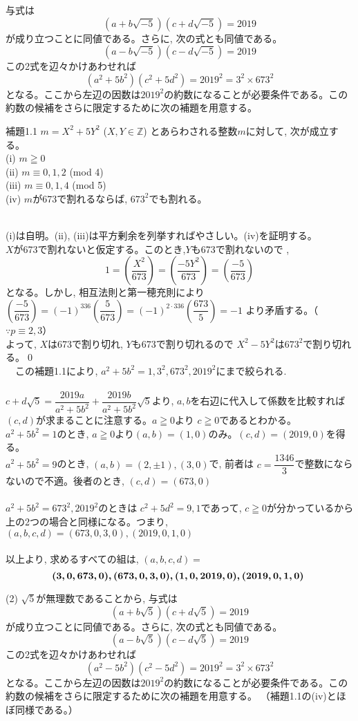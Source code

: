 \documentclass[twocolumn]{jsarticle}
\newcommand{\thm}{\begin{itembox}[l]}
\newcommand{\enthm}{\end{itembox}\\}
\renewcommand{\geq}{\geqq}
\newcommand{\mb}{\mathbb}
\begin{document}
与式は
\[(a+b\sqrt{-5})(c+d\sqrt{-5})=2019\]
が成り立つことに同値である。さらに, 次の式とも同値である。
\[(a-b\sqrt{-5})(c-d\sqrt{-5})=2019\]
この2式を辺々かけあわせれば
\[(a^2+5b^2)(c^2+5d^2)=2019^2=3^2\times 673^2\]
となる。ここから左辺の因数は$2019^2$の約数になることが必要条件である。この約数の候補をさらに限定するために次の補題を用意する。 
\thm{補題1.1}
$m=X^2+5Y^2$ ($X,Y\in \mb{Z}$) とあらわされる整数$m$に対して, 次が成立する。\\
(i) $m\geq 0$\\
(ii) $m\equiv 0,1,2$ (mod 4)\\
(iii) $m\equiv 0,1,4$ (mod 5)\\
(iv) $m$が673で割れるならば, $673^2$でも割れる。
\enthm
(i)は自明。(ii), (iii)は平方剰余を列挙すればやさしい。(iv)を証明する。\\
$X$が673で割れないと仮定する。このとき,$Y$も673で割れないので
,\[1=\left(\dfrac{X^2}{673}\right)=\left(\dfrac{-5Y^2}{673}\right)=\left(\dfrac{-5}{673}\right)\]
となる。しかし, 相互法則と第一穂充則により $\left(\dfrac{-5}{673}\right)=(-1)^{336}\left(\dfrac{5}{673}\right)=(-1)^{2\cdot 336}\left(\dfrac{673}{5}\right)=-1$ より矛盾する。（$\because p\equiv 2,3$）\\
よって, $X$は673で割り切れ, $Y$も673で割り切れるので $X^2-5Y^2$は$673^2$で割り切れる。\qed\\
　この補題1.1により, $a^2+5b^2=1,3^2,673^2,2019^2$にまで絞られる.\\
\\
$c+d\sqrt{5}=\dfrac{2019a}{a^2+5b^2}+\dfrac{2019b}{a^2+5b^2}\sqrt{5}$より, $a,b$を右辺に代入して係数を比較すれば$(c,d)$が求まることに注意する。$a\geq 0$より $c\geq 0$であるとわかる。\\
$a^2+5b^2=1$のとき, $a\geq 0 $より$(a,b)=(1,0)$のみ。$(c,d)=(2019,0)$を得る。
\\
$a^2+5b^2=9$のとき, $(a,b)=(2,\pm 1), (3,0)$で, 前者は $c=\dfrac{1346}{3}$で整数にならないので不適。後者のとき, $(c,d)=(673, 0)$\\
\\
$a^2+5b^2=673^2, 2019^2$のときは $c^2+5d^2=9,1$であって, $c\geq 0$が分かっているから上の2つの場合と同様になる。つまり, $(a,b,c,d)=(673,0,3,0), (2019,0,1,0)$\\
\\
以上より, 求めるすべての組は, $(a,b,c,d)=$
\[\mbox{{\boldmath  $(3,0,673,0),(673,0,3,0),(1,0,2019,0),(2019,0,1,0)$} }\]

(2)  $\sqrt{5}$が無理数であることから, 与式は
\[(a+b\sqrt{5})(c+d\sqrt{5})=2019\]
が成り立つことに同値である。さらに, 次の式とも同値である。
\[(a-b\sqrt{5})(c-d\sqrt{5})=2019\]
この2式を辺々かけあわせれば
\[(a^2-5b^2)(c^2-5d^2)=2019^2=3^2\times 673^2\]
となる。ここから左辺の因数は$2019^2$の約数になることが必要条件である。この約数の候補をさらに限定するために次の補題を用意する。 （補題1.1の(iv)とほぼ同様である。）
\end{document}
